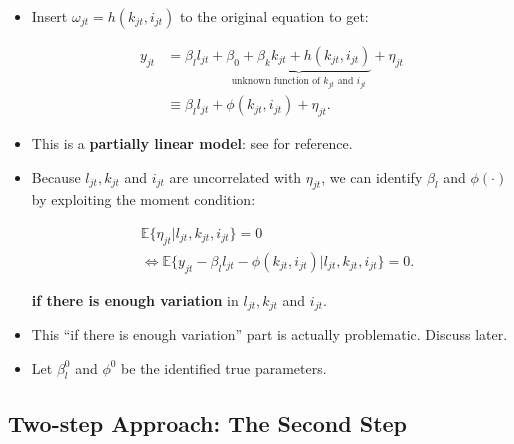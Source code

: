 \documentclass[]{book}
\providecommand{\tightlist}{%
  \setlength{\itemsep}{0pt}\setlength{\parskip}{0pt}}
\begin{document}
\begin{itemize}
\tightlist
\item
  Insert \(\omega_{jt} = h(k_{jt}, i_{jt})\) to the original equation to
  get:

  \begin{equation}
  \begin{split}
  y_{jt} &= \beta_l l_{jt} + \underbrace{\beta_0 + \beta_k k_{jt} + h(k_{jt}, i_{jt})}_{\text{unknown function of $k_{jt}$ and $i_{jt}$}} + \eta_{jt}\\
  & \equiv \beta_l l_{jt} + \phi(k_{jt}, i_{jt}) + \eta_{jt}.
  \end{split}
  \end{equation}
\item
  This is a \textbf{partially linear model}: see \citet{Ichimura2007}
  for reference.
\item
  Because \(l_{jt}, k_{jt}\) and \(i_{jt}\) are uncorrelated with
  \(\eta_{jt}\), we can identify \(\beta_l\) and \(\phi(\cdot)\) by
  exploiting the moment condition:

  \begin{equation}
  \begin{split}
  & \mathbb{E}\{\eta_{jt}|l_{jt}, k_{jt}, i_{jt}\} = 0\\
  & \Leftrightarrow \mathbb{E}\{y_{jt} - \beta_l l_{jt} - \phi(k_{jt}, i_{jt}) |l_{jt}, k_{jt}, i_{jt}\} = 0.
  \end{split}
  \end{equation}

  \textbf{if there is enough variation} in \(l_{jt}, k_{jt}\) and
  \(i_{jt}\).
\item
  This ``if there is enough variation'' part is actually problematic.
  Discuss later.
\item
  Let \(\beta_l^0\) and \(\phi^0\) be the identified true parameters.
\end{itemize}

\subsection{Two-step Approach: The Second
Step}\label{two-step-approach-the-second-step}
\end{document}

